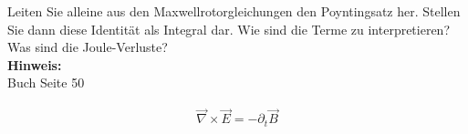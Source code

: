 \begin{question}[section=2,subsection=23,name={Poynting Satz},difficulty=5,type=mdl,tags={}]
	Leiten Sie alleine aus den Maxwellrotorgleichungen den Poyntingsatz her. Stellen Sie dann diese Identit\"at als Integral dar. Wie sind die Terme zu interpretieren? Was sind die Joule-Verluste?
	\\ \textbf{Hinweis:}\\
	Buch Seite 50
\end{question}
\begin{solution}
	\begin{align}
		\vec \nabla \times \vec E = - \partial _t \vec B
	\end{align}
\end{solution}